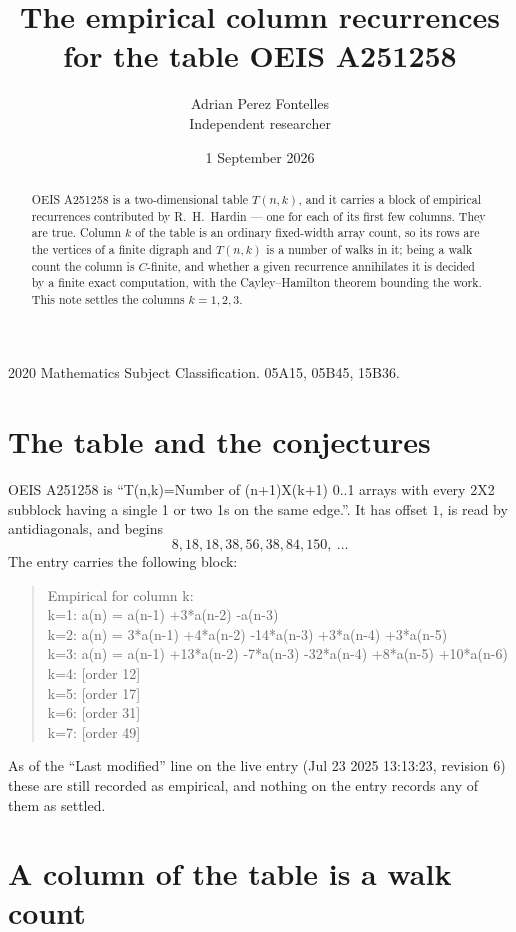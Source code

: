 \documentclass[11pt,a4paper]{article}
\title{The empirical column recurrences for the table OEIS A251258}
\author{Adrian Perez Fontelles\\ \small Independent researcher}
\date{1 September 2026}
\theoremstyle{plain}
\theoremstyle{definition}
\begin{document}
\maketitle

\begin{abstract}
OEIS A251258 is a two-dimensional table $T(n,k)$, and it carries a block of empirical
recurrences contributed by R.~H.~Hardin --- one for each of its first few columns. They are
true. Column $k$ of the table is an ordinary fixed-width array count, so its rows are the
vertices of a finite digraph and $T(n,k)$ is a number of walks in it; being a walk count the
column is $C$-finite, and whether a given recurrence annihilates it is decided by a finite
exact computation, with the Cayley--Hamilton theorem bounding the work. This note settles the columns $k=1, 2, 3$.
\end{abstract}

\noindent\small 2020 Mathematics Subject Classification. 05A15, 05B45, 15B36.\normalsize

\section{The table and the conjectures}

OEIS A251258 is ``T(n,k)=Number of (n+1)X(k+1) 0..1 arrays with every 2X2 subblock having a single 1 or two 1s on the same edge.''. It has offset $1$, is
read by antidiagonals, and begins
\[
8, 18, 18, 38, 56, 38, 84, 150,\ \dots
\]
The entry carries the following block:
\begin{quote}\small
Empirical for column k:\\
k=1: a(n) = a(n-1) +3*a(n-2) -a(n-3)\\
k=2: a(n) = 3*a(n-1) +4*a(n-2) -14*a(n-3) +3*a(n-4) +3*a(n-5)\\
k=3: a(n) = a(n-1) +13*a(n-2) -7*a(n-3) -32*a(n-4) +8*a(n-5) +10*a(n-6)\\
k=4: [order 12]\\
k=5: [order 17]\\
k=6: [order 31]\\
k=7: [order 49]\\
\end{quote}
As of the ``Last modified'' line on the live entry (Jul 23 2025 13:13:23, revision 6) these are still
recorded as empirical, and nothing on the entry records any of them as settled.

\section{A column of the table is a walk count}
\end{document}
